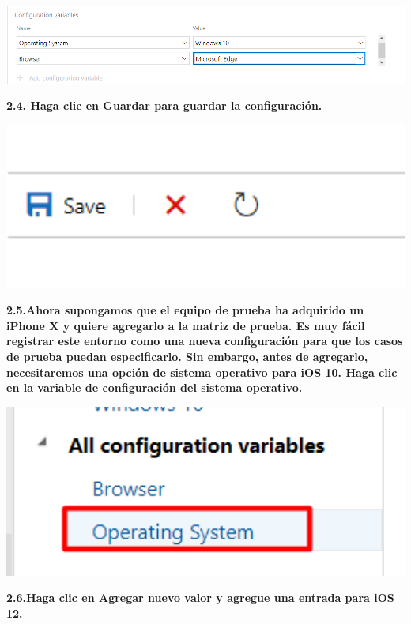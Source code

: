 \documentclass{article}
\begin{document}
    \begin{center}
		\includegraphics[width=14cm]{./images/2.7}
	\end{center}
		
\newpage
\textbf{2.4.  Haga clic en Guardar para guardar la configuración.}

    \begin{center}
		\includegraphics[width=14cm]{./images/2.8} 
	\end{center}
		
\textbf{2.5.Ahora supongamos que el equipo de prueba ha adquirido un iPhone X y quiere agregarlo a la matriz de prueba. Es muy fácil registrar este entorno como una nueva configuración para que los casos de prueba puedan especificarlo. Sin embargo, antes de agregarlo, necesitaremos una opción de sistema operativo para iOS 10. Haga clic en la variable de configuración del sistema operativo.}

    \begin{center}
		\includegraphics[width=14cm]{./images/2.9} 
	\end{center}
		
\newpage
\textbf{2.6.Haga clic en Agregar nuevo valor y agregue una entrada para iOS 12.}
\end{document}
